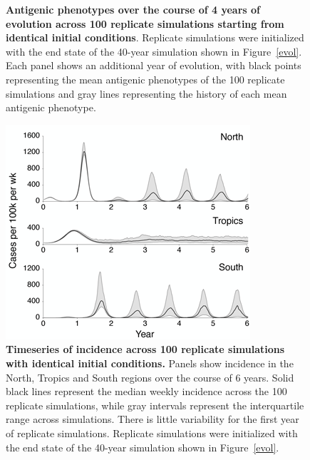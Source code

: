 \documentclass[11pt,oneside,letterpaper]{article}
\begin{document}
\begin{figure}[H]
	\centering
	\caption{\textbf{Antigenic phenotypes over the course of 4 years of evolution across 100 replicate simulations starting from identical initial conditions}.  Replicate simulations were initialized with the end state of the  40-year simulation shown in Figure~\ref{evol}.  Each panel shows an additional year of evolution, with black points representing the mean antigenic phenotypes of the 100 replicate simulations and gray lines representing the history of each mean antigenic phenotype.}
	\label{replicateevol}
\end{figure}

\begin{figure}[H]
	\centering
	\includegraphics{figures/replicateinc}
	\caption{\textbf{Timeseries of incidence across 100 replicate simulations with identical initial conditions.} Panels show incidence in the North, Tropics and South regions over the course of 6 years.  Solid black lines represent the median weekly incidence across the 100 replicate simulations, while gray intervals represent the interquartile range across simulations.  There is little variability for the first year of replicate simulations.  Replicate simulations were initialized with the end state of the 40-year simulation shown in Figure~\ref{evol}.}
	\label{replicateinc}
\end{figure}
\end{document}
